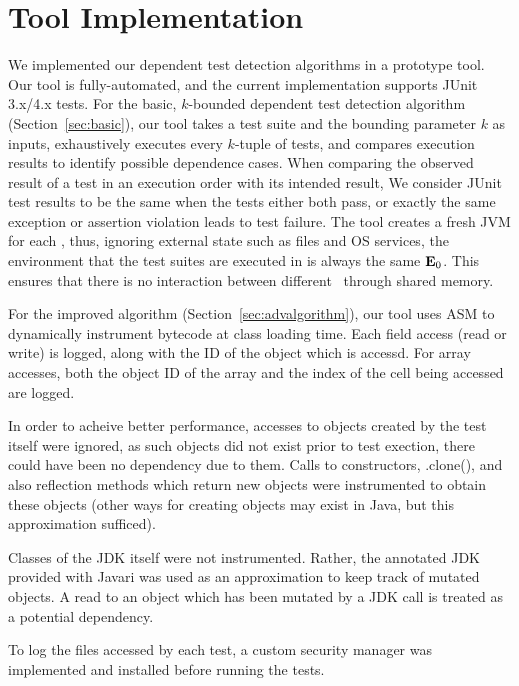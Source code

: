 \section{Tool Implementation}
\label{sec:impl}


We implemented our dependent test detection algorithms in
a prototype tool. Our tool is fully-automated, and the
current implementation supports JUnit 3.x/4.x tests.
For the basic, $k$-bounded dependent test detection algorithm
(Section~\ref{sec:basic}), our tool takes a test suite
and the bounding parameter $k$ as inputs, 
exhaustively executes every $k$-tuple
of tests, and compares execution results to identify possible dependence cases. When
comparing the observed result of a test in an execution order with
its intended result,
We consider JUnit test results to be the same when the tests either
both pass, or exactly the same exception or assertion violation leads
to test failure.
The tool creates a fresh JVM for each \testlist, thus, ignoring
external state such as files and OS services, the environment
that the test suites are executed in is always the same $\mathbf{E}_0$.
This ensures that there is no interaction between
different \testlist\ through shared memory.

For the improved algorithm (Section~\ref{sec:advalgorithm}),
our tool uses ASM to dynamically instrument bytecode at 
class loading time. Each field access (read or write) is logged,
along with the ID of the object which is accessd. For array accesses,
both the object ID of the array and the index of the cell being accessed
are logged.

In order to acheive better performance, accesses to objects created
by the test itself were ignored, as such objects did not exist prior
to test exection, there could have been no dependency due to them.
Calls to constructors, .clone(), and also reflection methods which
return new objects were instrumented to obtain these objects (other ways for creating objects
may exist in Java, but this approximation sufficed).

Classes of the JDK itself were not instrumented. Rather, the annotated 
JDK provided with Javari \cite{??} was used as an approximation
to keep track of mutated objects. A read to an object which has been
mutated by a JDK call is treated as a potential  dependency.


To log the files accessed by each test, a custom security manager was
implemented and installed before running the tests. 

